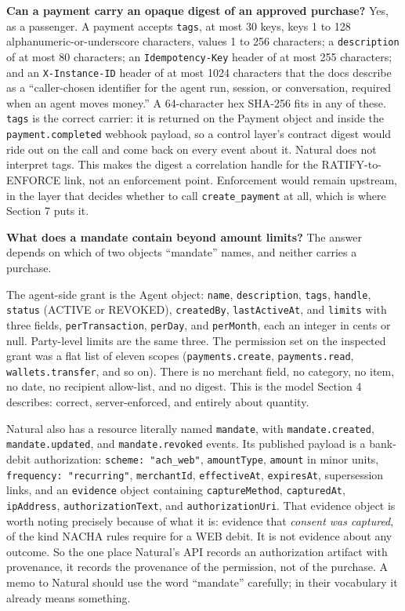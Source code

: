 \documentclass[
  11pt,
  letterpaper,
]{article}
\begin{document}
\textbf{Can a payment carry an opaque digest of an approved purchase?}
Yes, as a passenger. A payment accepts \texttt{tags}, at most 30 keys,
keys 1 to 128 alphanumeric-or-underscore characters, values 1 to 256
characters; a \texttt{description} of at most 80 characters; an
\texttt{Idempotency-Key} header of at most 255 characters; and an
\texttt{X-Instance-ID} header of at most 1024 characters that the docs
describe as a ``caller-chosen identifier for the agent run, session, or
conversation, required when an agent moves money.'' A 64-character hex
SHA-256 fits in any of these. \texttt{tags} is the correct carrier: it
is returned on the Payment object and inside the
\texttt{payment.completed} webhook payload, so a control layer's
contract digest would ride out on the call and come back on every event
about it. Natural does not interpret tags. This makes the digest a
correlation handle for the RATIFY-to-ENFORCE link, not an enforcement
point. Enforcement would remain upstream, in the layer that decides
whether to call \texttt{create\_payment} at all, which is where Section
7 puts it.

\textbf{What does a mandate contain beyond amount limits?} The answer
depends on which of two objects ``mandate'' names, and neither carries a
purchase.

The agent-side grant is the Agent object: \texttt{name},
\texttt{description}, \texttt{tags}, \texttt{handle}, \texttt{status}
(ACTIVE or REVOKED), \texttt{createdBy}, \texttt{lastActiveAt}, and
\texttt{limits} with three fields, \texttt{perTransaction},
\texttt{perDay}, and \texttt{perMonth}, each an integer in cents or
null. Party-level limits are the same three. The permission set on the
inspected grant was a flat list of eleven scopes
(\texttt{payments.create}, \texttt{payments.read},
\texttt{wallets.transfer}, and so on). There is no merchant field, no
category, no item, no date, no recipient allow-list, and no digest. This
is the model Section 4 describes: correct, server-enforced, and entirely
about quantity.

Natural also has a resource literally named \texttt{mandate}, with
\texttt{mandate.created}, \texttt{mandate.updated}, and
\texttt{mandate.revoked} events. Its published payload is a bank-debit
authorization: \texttt{scheme:\ "ach\_web"}, \texttt{amountType},
\texttt{amount} in minor units, \texttt{frequency:\ "recurring"},
\texttt{merchantId}, \texttt{effectiveAt}, \texttt{expiresAt},
supersession links, and an \texttt{evidence} object containing
\texttt{captureMethod}, \texttt{capturedAt}, \texttt{ipAddress},
\texttt{authorizationText}, and \texttt{authorizationUri}. That evidence
object is worth noting precisely because of what it is: evidence that
\emph{consent was captured}, of the kind NACHA rules require for a WEB
debit. It is not evidence about any outcome. So the one place Natural's
API records an authorization artifact with provenance, it records the
provenance of the permission, not of the purchase. A memo to Natural
should use the word ``mandate'' carefully; in their vocabulary it
already means something.
\end{document}
